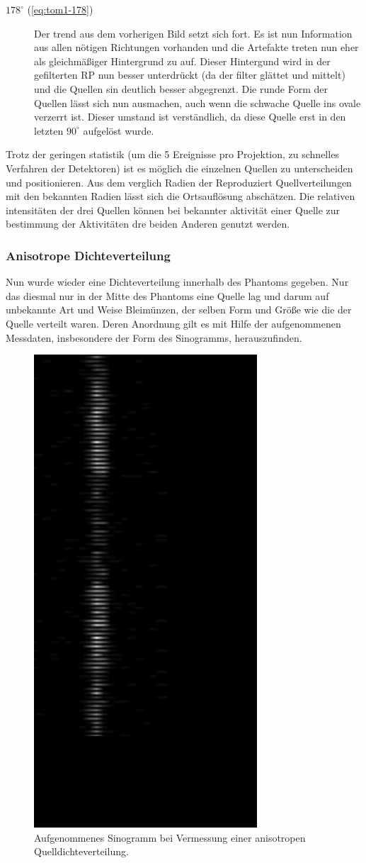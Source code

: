 \documentclass[slug=PET, room=Andreas-Schubert-Bau\,\ 424A, supervisor=Carsten\ Bittrich, coursedate=10.\ 01.\ 2020]{../../Lab_Report_LaTeX/lab_report}
\begin{document}
\begin{description}
\item[\(178^\circ\) (\ref{eq:tom1-178})] Der trend aus dem vorherigen
  Bild setzt sich fort. Es ist nun Information aus allen n\"otigen
  Richtungen vorhanden und die Artefakte treten nun eher als
  gleichm\"a\ss{}iger Hintergrund zu auf. Dieser Hintergund wird in
  der gefilterten RP nun besser unterdr\"uckt (da der filter gl\"attet
  und mittelt) und die Quellen sin deutlich besser abgegrenzt. Die
  runde Form der Quellen l\"asst sich nun ausmachen, auch wenn die
  schwache Quelle ins ovale verzerrt ist. Dieser umstand ist
  verst\"andlich, da diese Quelle erst in den letzten \(90^\circ\)
  aufgel\"ost wurde.
\end{description}


Trotz der geringen statistik (um die 5 Ereignisse pro Projektion, zu
schnelles Verfahren der Detektoren) ist es m\"oglich die einzelnen
Quellen zu unterscheiden und positionieren. Aus dem verglich Radien der
Reproduziert Quellverteilungen mit den bekannten Radien l\"asst sich
die Ortsaufl\"osung absch\"atzen.  Die relativen
intensit\"aten der drei Quellen k\"onnen bei bekannter aktivit\"at
einer Quelle zur bestimmung der Aktivitäten dre beiden Anderen genutzt werden.




\subsubsection{Anisotrope Dichteverteilung}
\label{sec:tom2}

Nun wurde wieder eine Dichteverteilung innerhalb des Phantoms gegeben. Nur das diesmal nur in der
Mitte des Phantoms eine Quelle lag und darum auf unbekannte Art und Weise Bleimünzen, der selben
Form und Größe wie die der Quelle verteilt waren. Deren Anordnung gilt es mit Hilfe der
aufgenommenen Messdaten, insbesondere der Form des Sinogramms, herauszufinden.

\begin{figure}[h]
	\centering
	\includegraphics[width=.3\textwidth, angle=90]{../messungen/Tom2/tom2_Sinogramm.PNG}
	\caption{Aufgenommenes Sinogramm bei Vermessung einer anisotropen Quelldichteverteilung.}
	\label{fig:tom2}
\end{figure}
\end{document}
